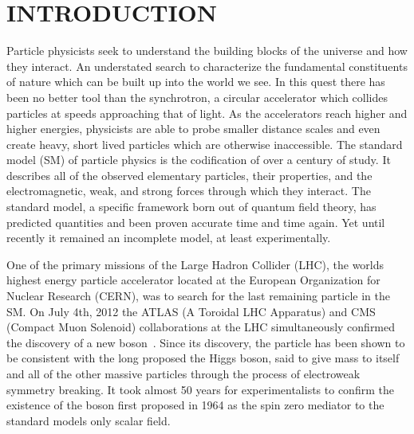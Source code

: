 %
%
%



\pagestyle{plain} %
\setcounter{page}{1}


\chapter{\uppercase {Introduction}}
\begin{comment}
1) Physics/colliders
2) Standard model
3) Higgs
4) This dissertation toppic
5) Organization
\end{comment}

Particle physicists seek to understand the building blocks of the universe and how they interact.
An understated search to characterize the fundamental constituents of nature which can be built up into the world we see.
In this quest there has been no better tool than the synchrotron, a circular accelerator which collides particles at speeds approaching that of light.
As the accelerators reach higher and higher energies, physicists are able to probe smaller distance scales and even create heavy, short lived particles which are otherwise inaccessible.
The standard model (SM) of particle physics is the codification of over a century of study.
It describes all of the observed elementary particles, their properties, and the electromagnetic, weak, and strong forces through which they interact.
The standard model, a specific framework born out of quantum field theory, has predicted quantities and been proven accurate time and time again.
Yet until recently it remained an incomplete model, at least experimentally.

One of the primary missions of the Large Hadron Collider (LHC), the worlds highest energy particle accelerator located at the European Organization for Nuclear Research (CERN), was to search for the last remaining particle in the SM.
On July 4th, 2012 the ATLAS (A Toroidal LHC Apparatus) and CMS (Compact Muon Solenoid) collaborations at the LHC simultaneously confirmed the discovery of a new boson~\cite{20121,201230}.
Since its discovery, the particle has been shown to be consistent with the long proposed the Higgs boson, said to give mass to itself and all of the other massive particles through the process of electroweak symmetry breaking.
It took almost 50 years for experimentalists to confirm the existence of the boson first proposed in 1964 as the spin zero mediator to the standard models only scalar field.

